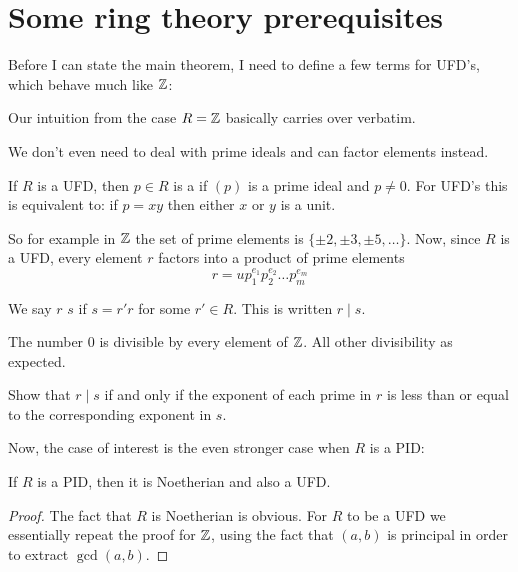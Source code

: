 \section{Some ring theory prerequisites}
Before I can state the main theorem, I need to define a few terms for UFD's,
which behave much like $\ZZ$:
\begin{moral}
	Our intuition from the case $R = \mathbb Z$ basically carries over verbatim.
\end{moral}
We don't even need to deal with prime ideals and can factor elements instead.

\begin{definition}
	If $R$ is a UFD, then $p \in R$ is a 
	if $(p)$ is a prime ideal and $p \neq 0$.
	For UFD's this is equivalent to:
	if $p = xy$ then either $x$ or $y$ is a unit.
\end{definition}
So for example in $\ZZ$ the set of prime elements is $\{\pm2, \pm3, \pm5, \dots\}$.
Now, since $R$ is a UFD, every element $r$ factors into a product of prime elements
\[ r = u p_1^{e_1} p_2^{e_2} \dots p_m^{e_m} \]

\begin{definition}
	We say $r$  $s$ if $s = r'r$ for some $r' \in R$. This is written $r \mid s$.
\end{definition}
\begin{example}
	[Divisibility in $\ZZ$]
	The number $0$ is divisible by every element of $\ZZ$.
	All other divisibility as expected.
\end{example}
\begin{ques}
	Show that $r \mid s$ if and only if the exponent of each prime in $r$ is
	less than or equal to the corresponding exponent in $s$.
\end{ques}

Now, the case of interest is the even stronger case when $R$ is a PID:
\begin{proposition}
	If $R$ is a PID, then it is Noetherian and also a UFD.
\end{proposition}
\begin{proof}
	The fact that $R$ is Noetherian is obvious.
	For $R$ to be a UFD we essentially repeat the proof for $\ZZ$,
	using the fact that $(a,b)$ is principal in order to extract
	$\gcd(a,b)$.
\end{proof}

